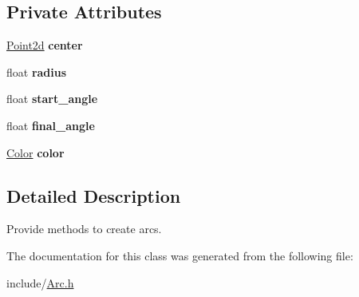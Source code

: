 \subsection*{Private Attributes}
\begin{DoxyCompactItemize}
\item 
\mbox{\label{classtiara_1_1Arc_a6b9de20ce7d93be6bf1c9928f592dabc}} 
\mbox{\hyperlink{classtiara_1_1Point2d}{Point2d}} {\bfseries center}
\item 
\mbox{\label{classtiara_1_1Arc_ad3874556faacd640465c3462adc2853e}} 
float {\bfseries radius}
\item 
\mbox{\label{classtiara_1_1Arc_aacb6cea07b2458a5c5e225cdf851b77b}} 
float {\bfseries start\+\_\+angle}
\item 
\mbox{\label{classtiara_1_1Arc_a38112d403f7ccc3d9a6ed7cd38ab4ea7}} 
float {\bfseries final\+\_\+angle}
\item 
\mbox{\label{classtiara_1_1Arc_a419d96fa0cab4b3f2ff97f3fce2bf9f2}} 
\mbox{\hyperlink{classtiara_1_1Color}{Color}} {\bfseries color}
\end{DoxyCompactItemize}


\subsection{Detailed Description}
Provide methods to create arcs. 

The documentation for this class was generated from the following file\+:\begin{DoxyCompactItemize}
\item 
include/\mbox{\hyperlink{Arc_8h}{Arc.\+h}}\end{DoxyCompactItemize}
